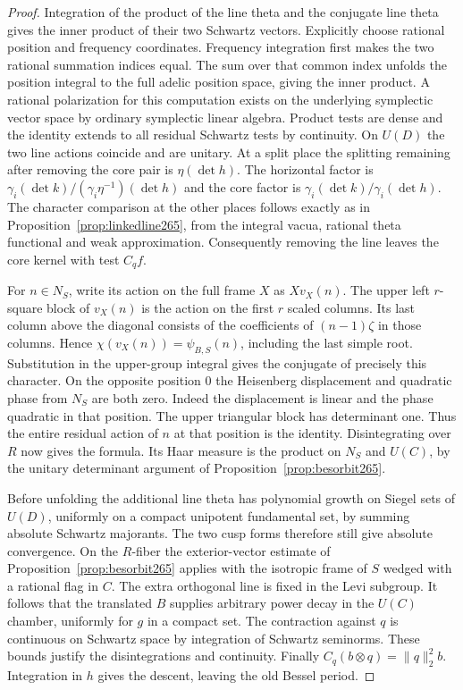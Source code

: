 \documentclass[a4paper,11pt]{article}
\theoremstyle{definition}
\theoremstyle{remark}
\numberwithin{equation}{section}
\begin{document}
\begin{proof}
Integration of the product of the line theta and the
conjugate line theta gives the inner product of their two
Schwartz vectors. Explicitly choose rational position and
frequency coordinates. Frequency integration first makes
the two rational summation indices equal. The sum over that
common index unfolds the position integral to the full
adelic position space, giving the inner product. A rational
polarization for this computation exists on the underlying
symplectic vector space by ordinary symplectic linear algebra.
Product tests are dense and the identity extends to all
residual Schwartz tests by continuity. On \(U(D)\) the
two line actions coincide and are unitary. At a split
place the splitting remaining after removing the core pair
is \(\eta(\det h)\). The horizontal factor is
\(\gamma_i(\det k)/(\gamma_i\eta^{-1})(\det h)\)
and the core factor is \(\gamma_i(\det k)/\gamma_i(\det h)\).
The character comparison at the other places follows exactly
as in Proposition~\ref{prop:linkedline265}, from the integral
vacua, rational theta functional and weak approximation.
Consequently removing the line leaves the core kernel with
test \(C_q f\).

For \(n\in N_S\), write its action on the full frame \(X\)
as \(Xv_X(n)\). The upper left \(r\)-square block of \(v_X(n)\)
is the action on the first \(r\) scaled columns. Its last
column above the diagonal consists of the coefficients of
\((n-1)\zeta\) in those columns. Hence
\(\chi(v_X(n))=\psi_{B,S}(n)\), including the last simple
root. Substitution in the upper-group integral gives the
conjugate of precisely this character. On the opposite
position \(0\) the Heisenberg displacement and quadratic
phase from \(N_S\) are both zero. Indeed the displacement
is linear and the phase quadratic in that position. The
upper triangular block has determinant one. Thus the entire
residual action of \(n\) at that position is the identity.
Disintegrating over \(R\) now gives the formula. Its Haar
measure is the product on \(N_S\) and \(U(C)\), by the
unitary determinant argument of
Proposition~\ref{prop:besorbit265}.

Before unfolding the additional line theta has polynomial
growth on Siegel sets of \(U(D)\), uniformly on a compact
unipotent fundamental set, by summing absolute Schwartz
majorants. The two cusp forms therefore still give absolute
convergence. On the \(R\)-fiber the exterior-vector estimate
of Proposition~\ref{prop:besorbit265} applies with the
isotropic frame of \(S\) wedged with a rational flag in \(C\).
The extra orthogonal line is fixed in the Levi subgroup.
It follows that the translated \(B\) supplies arbitrary
power decay in the \(U(C)\) chamber, uniformly for \(g\)
in a compact set. The contraction against \(q\) is continuous
on Schwartz space by integration of Schwartz seminorms.
These bounds justify the disintegrations and continuity.
Finally \(C_q(b\otimes q)=\|q\|_2^2b\). Integration in \(h\)
gives the descent, leaving the old Bessel period.
\end{proof}
\end{document}
